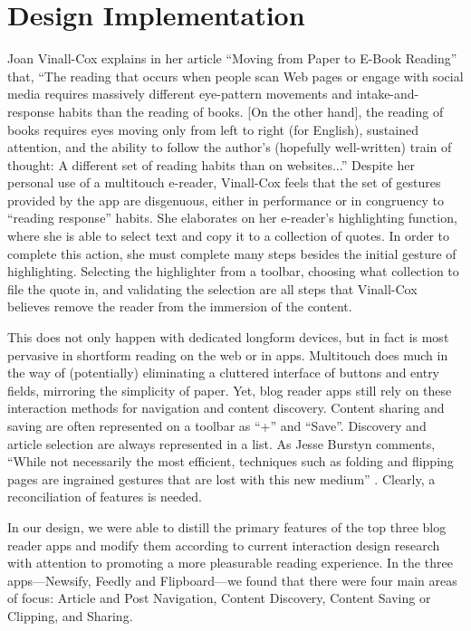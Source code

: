 \documentclass[11pt, oneside]{article}   	%
\begin{document}
\section{Design Implementation}
Joan Vinall-Cox explains in her article ``Moving from Paper to E-Book Reading'' that, ``The reading that occurs when people scan Web pages or engage with social media requires massively different eye-pattern movements and intake-and-response habits than the reading of books. [On the other hand], the reading of books requires eyes moving only from left to right (for English), sustained attention, and the ability to follow the author's (hopefully well-written) train of thought: A different set of reading habits than on websites...'' \cite{vinall-cox} Despite her personal use of a multitouch e-reader, Vinall-Cox feels that the set of gestures provided by the app are disgenuous, either in performance or in congruency to ``reading response'' habits. She elaborates on her e-reader's highlighting function, where she is able to select text and copy it to a collection of quotes. In order to complete this action, she must complete many steps besides the initial gesture of highlighting. Selecting the highlighter from a toolbar, choosing what collection to file the quote in, and validating the selection are all steps that Vinall-Cox believes remove the reader from the immersion of the content.

This does not only happen with dedicated longform devices, but in fact is most pervasive in shortform reading on the web or in apps. Multitouch does much in the way of (potentially) eliminating a cluttered interface of buttons and entry fields, mirroring the simplicity of paper. Yet, blog reader apps still rely on these interaction methods for navigation and content discovery. Content sharing and saving are often represented on a toolbar as ``+'' and ``Save''. Discovery and article selection are always represented in a list. As Jesse Burstyn comments, ``While not necessarily the most efficient, techniques such as folding and flipping pages are ingrained gestures that are lost with this new medium'' \cite{Burstyn}.  Clearly, a reconciliation of features is needed.

In our design, we were able to distill the primary features of the top three blog reader apps and modify them according to current interaction design research with attention to promoting a more pleasurable reading experience. In the three apps---Newsify, Feedly and Flipboard---we found that there were four main areas of focus: Article and Post Navigation, Content Discovery, Content Saving or Clipping, and Sharing. 
\end{document}
